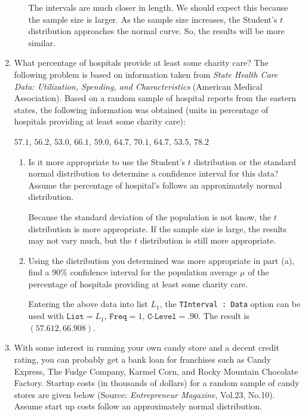 \documentclass{article}
\newcommand{\answer}[1]{\color{white}#1}
\begin{document}
\begin{enumerate}
\begin{enumerate}
{	The intervals are much closer in length.  We should expect this because the sample size is larger.  As the sample size increases, the Student's $t$ distribution approaches the normal curve.  So, the results will be more similar.
	} 
	\end{enumerate}

\item What percentage of hospitals provide at least some charity care?  The following problem is based on information taken from {\em State Health Care Data: Utilization, Spending, and Characteristics} (American Medical Association).  Based on a random sample of hospital reports from the eastern states, the following information was obtained (units in percentage of hospitals providing at least some charity care):
\begin{center}
$57.1$, $56.2$, $53.0$, $66.1$, $59.0$, $64.7$, $70.1$, $64.7$, $53.5$, $78.2$
\end{center}
	\begin{enumerate}
	\item Is it more appropriate to use the Student's $t$ distribution or the standard normal distribution to determine a confidence interval for this data? Assume the percentage of hospital's follows an approximately normal distribution.
	
	{\answer  Because the standard deviation of the population is not know, the $t$ distribution is more appropriate.  If the sample size is large, the results may not vary much, but the $t$ distribution is still more appropriate.
	} 
	
	\item Using the distribution you determined was more appropriate in part (a), find a 90\% confidence interval for the population average $\mu$ of the percentage of hospitals providing at least some charity care. 
	
	{\answer Entering the above data into list $L_1$, the \texttt{TInterval : Data} option can be used with
	$\texttt{List} = L_1$, $\texttt{Freq} = 1$, $\texttt{C-Level} = .90$.  The result is $(57.612, 66.908)$.
	} 
	\end{enumerate}

\newpage

\item With some interest in running your own candy store and a decent credit rating, you can probably get a bank loan for franchises such as Candy Express, The Fudge Company, Karmel Corn, and Rocky Mountain Chocolate Factory.  Startup costs (in thousands of dollars) for a random sample of candy stores are given below (Source: {\em Entrepreneur Magazine}, Vol.23, No.10). Assume start up costs follow an approximately normal distribution.


\end{enumerate}
\end{document}
